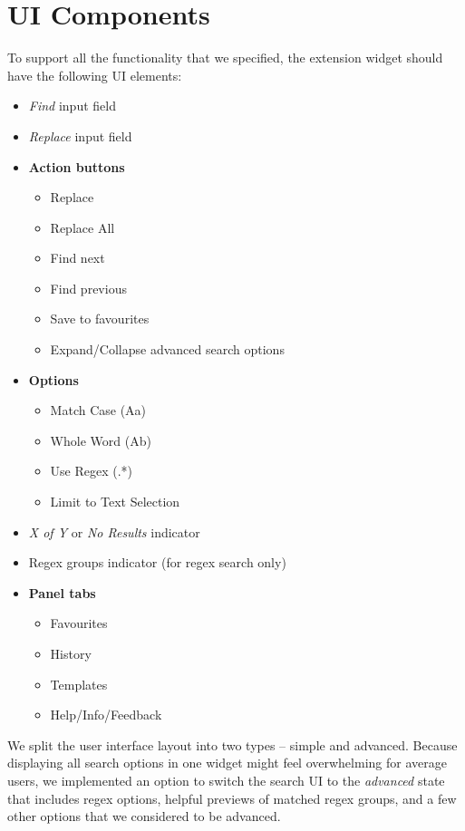 \documentclass[bsc,frontabs,twoside,singlespacing,parskip,deptreport]{infthesis}
\providecommand{\tightlist}{%
  \setlength{\itemsep}{0pt}\setlength{\parskip}{0pt}}
\begin{document}
\section{UI Components}
To support all the functionality that we specified, the extension widget should have the following UI elements:
\begin{itemize}
\tightlist
\item
  \textit{Find} input field
\item
  \textit{Replace} input field
\item
  \textbf{Action buttons}

  \begin{itemize}
  \tightlist
  \item
    Replace
  \item
    Replace All
  \item
    Find next
  \item
    Find previous
  \item
    Save to favourites
  \item
  	Expand/Collapse advanced search options
  \end{itemize}
\item
  \textbf{Options}

  \begin{itemize}
  \tightlist
  \item
    Match Case (Aa)
  \item
    Whole Word (Ab\textbar{})
  \item
    Use Regex (.*)
  \item
    Limit to Text Selection
  \end{itemize}
\item
  \textit{X of Y} or \textit{No Results} indicator
\item
  Regex groups indicator (for regex search only)
\item
  \textbf{Panel tabs}

  \begin{itemize}
  \item
    Favourites
  \item
    History
  \item
    Templates
  \item
    Help/Info/Feedback
  \end{itemize}
\end{itemize}

We split the user interface layout into two types -- simple and advanced. Because displaying all search options in one widget might feel overwhelming for average users, we implemented an option to switch the search UI to the \textit{advanced} state that includes regex options, helpful previews of matched regex groups, and a few other options that we considered to be advanced.
\end{document}
